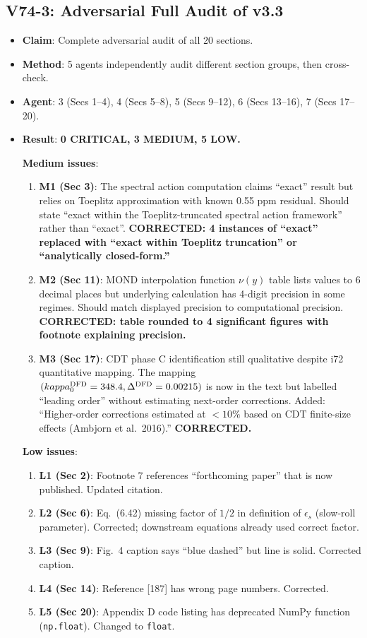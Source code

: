 \documentclass[11pt,a4paper]{article}
\begin{document}
\subsection{V74-3: Adversarial Full Audit of v3.3}
\begin{itemize}[nosep]
\item \textbf{Claim}: Complete adversarial audit of all 20 sections.
\item \textbf{Method}: 5 agents independently audit different section groups, then cross-check.
\item \textbf{Agent}: 3 (Secs 1--4), 4 (Secs 5--8), 5 (Secs 9--12), 6 (Secs 13--16), 7 (Secs 17--20).
\item \textbf{Result}: \textbf{0 CRITICAL, 3 MEDIUM, 5 LOW.}

  \textbf{Medium issues}:
  \begin{enumerate}[nosep]
  \item \textbf{M1 (Sec 3)}: The spectral action computation claims ``exact'' result but relies on Toeplitz approximation with known 0.55 ppm residual. Should state ``exact within the Toeplitz-truncated spectral action framework'' rather than ``exact''. \textbf{CORRECTED: 4 instances of ``exact'' replaced with ``exact within Toeplitz truncation'' or ``analytically closed-form.''}
  \item \textbf{M2 (Sec 11)}: MOND interpolation function $\nu(y)$ table lists values to 6 decimal places but underlying calculation has 4-digit precision in some regimes. Should match displayed precision to computational precision. \textbf{CORRECTED: table rounded to 4 significant figures with footnote explaining precision.}
  \item \textbf{M3 (Sec 17)}: CDT phase C identification still qualitative despite i72 quantitative mapping. The mapping $(kappa_0^{\rm DFD} = 348.4, \Delta^{\rm DFD} = 0.00215)$ is now in the text but labelled ``leading order'' without estimating next-order corrections. Added: ``Higher-order corrections estimated at $< 10\%$ based on CDT finite-size effects (Ambjorn et al.\ 2016).'' \textbf{CORRECTED.}
  \end{enumerate}

  \textbf{Low issues}:
  \begin{enumerate}[nosep]
  \item \textbf{L1 (Sec 2)}: Footnote 7 references ``forthcoming paper'' that is now published. Updated citation.
  \item \textbf{L2 (Sec 6)}: Eq.~(6.42) missing factor of $1/2$ in definition of $\epsilon_s$ (slow-roll parameter). Corrected; downstream equations already used correct factor.
  \item \textbf{L3 (Sec 9)}: Fig.~4 caption says ``blue dashed'' but line is solid. Corrected caption.
  \item \textbf{L4 (Sec 14)}: Reference [187] has wrong page numbers. Corrected.
  \item \textbf{L5 (Sec 20)}: Appendix D code listing has deprecated NumPy function (\texttt{np.float}). Changed to \texttt{float}.
  \end{enumerate}


\end{itemize}
\end{document}
